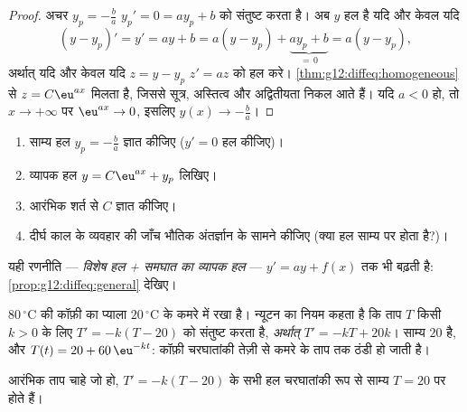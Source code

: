\begin{proof}
अचर $y_p = -\frac{b}{a}$ $y_p' = 0 = a y_p + b$ को संतुष्ट करता है। अब $y$ हल है यदि और केवल यदि
\[
(y - y_p)' = y' = ay + b = a(y - y_p) + \underbrace{a y_p + b}_{=\,0}
= a (y - y_p),
\]
अर्थात् यदि और केवल यदि $z = y - y_p$ $z' = az$ को हल करे। \cref{thm:g12:diffeq:homogeneous} से $z = C\eu^{ax}$ मिलता है, जिससे
सूत्र, अस्तित्व और अद्वितीयता निकल आते हैं। यदि $a < 0$ हो, तो $x \to +\infty$ पर $\eu^{ax} \to 0$,
इसलिए $y(x) \to -\frac ba$।
\end{proof}

\begin{method}[आरंभिक शर्त के साथ $y' = ay + b$ हल करना]\label{met:g12:diffeq:solve}
\begin{enumerate}
  \item साम्य हल $y_p = -\frac{b}{a}$ ज्ञात कीजिए ($y' = 0$ हल कीजिए)।
  \item व्यापक हल $y = C\eu^{ax} + y_p$ लिखिए।
  \item आरंभिक शर्त से $C$ ज्ञात कीजिए।
  \item दीर्घ काल के व्यवहार की जाँच भौतिक अंतर्ज्ञान के सामने कीजिए (क्या
        हल साम्य पर  होता है?)।
\end{enumerate}
यही रणनीति --- \emph{विशेष हल + समघात  का व्यापक हल} --- $y' = ay + f(x)$ तक भी
बढ़ती है: \cref{prop:g12:diffeq:general} देखिए।
\end{method}

\begin{example}[न्यूटन का शीतलन नियम]\label{ex:g12:diffeq:cooling}
$80\,^\circ$C की कॉफ़ी का प्याला $20\,^\circ$C के कमरे में रखा है। न्यूटन का नियम कहता है कि
ताप $T$ किसी $k > 0$ के लिए $T' = -k(T - 20)$ को संतुष्ट करता है, \emph{अर्थात्} $T' = -kT + 20k$। साम्य
$20$ है, और $T(t) = 20 + 60\,\eu^{-kt}$: कॉफ़ी चरघातांकी तेज़ी से कमरे के ताप तक ठंडी हो जाती है।
\end{example}

\begin{omfigure}

{\small आरंभिक ताप चाहे जो हो, $T' = -k(T - 20)$ के सभी हल चरघातांकी रूप से साम्य $T = 20$ पर
 होते हैं।}
\end{omfigure}

